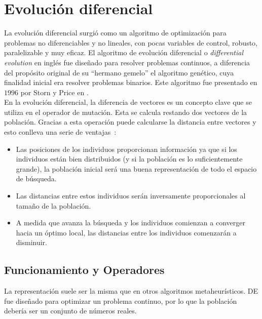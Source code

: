 \section{Evolución diferencial}
La evolución diferencial surgió como un algoritmo de optimización para problemas no diferenciables y no lineales, con pocas variables de control, robusto, paralelizable y muy eficaz. El algoritmo de evolución diferencial o \textit{differential evolution} en inglés fue diseñado para resolver problemas continuos, a diferencia del propósito original de su ``hermano gemelo'' el algoritmo genético, cuya finalidad inicial era resolver problemas binarios. Este algoritmo fue presentado en $1996$ por Storn y Price en \cite{storn_differential_1997}.\\[6pt]
En la evolución diferencial, la diferencia de vectores es un concepto clave que se utiliza en el operador de mutación. Esta se calcula restando dos vectores de la población. Gracias a esta operación puede calcularse la distancia entre vectores y esto conlleva una serie de ventajas~\cite{storn_differential_1997}:
\begin{itemize}
    \item Las posiciones de los individuos proporcionan información ya que si los individuos están bien distribuidos (y si la población es lo suficientemente grande), la población inicial será una buena representación de todo el espacio de búsqueda.
    \item Las distancias entre estos individuos serán inversamente proporcionales al tamaño de la población.
    \item A medida que avanza la búsqueda y los individuos comienzan a converger hacia un óptimo local, las distancias entre los individuos comenzarán a disminuir.
\end{itemize}

\subsection{Funcionamiento y Operadores}
La representación suele ser la misma que en otros algoritmos metaheurísticos. DE fue diseñado para optimizar un problema continuo, por lo que la población debería ser un conjunto de números reales.

